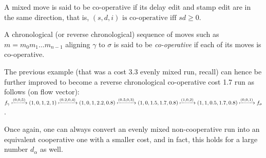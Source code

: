 \documentclass[runningheads]{llncs}
\begin{document}
    \begin{definition}[Co-operation]
        A mixed move is said to be co-operative if its delay edit and stamp edit are in the same direction, that is, 
        $(s, d, i) \textrm{ is co-operative iff } sd \geq 0$. 
        
        A chronological (or reverse chronological) sequence of moves such as $m = m_0m_1\dots m_{n-1}$ aligning $\gamma$ to $\sigma$ is said to be \textit{co-operative} if each of its moves is co-operative. 
    \end{definition}
    
    
    \begin{example}The previous example (that was a cost 3.3 evenly mixed run, recall) can hence be further improved to become a reverse chronological co-operative cost 1.7 run as follows (on flow vector): 
$f_\gamma \xmapsto{(0, 0, 5)} (1, 0, 1, 2, 1) \xmapsto{(0.2, 0, 4)} (1, 0, 1, 2.2, 0.8) \xmapsto{(0.5, 0, 3)}(1, 0, 1.5, 1.7, 0.8) \xmapsto{(1, 0, 2)} (1, 1, 0.5, 1.7, 0.8) \xmapsto{(0, 0, 1)} f_\sigma $. 
        
    \end{example}
    
    Once again, one can always convert an evenly mixed non-cooperative run into an equivalent cooperative one with a smaller cost, and in fact, this holds for a large number $d_{\alpha}$ as well. 
    
\end{document}
